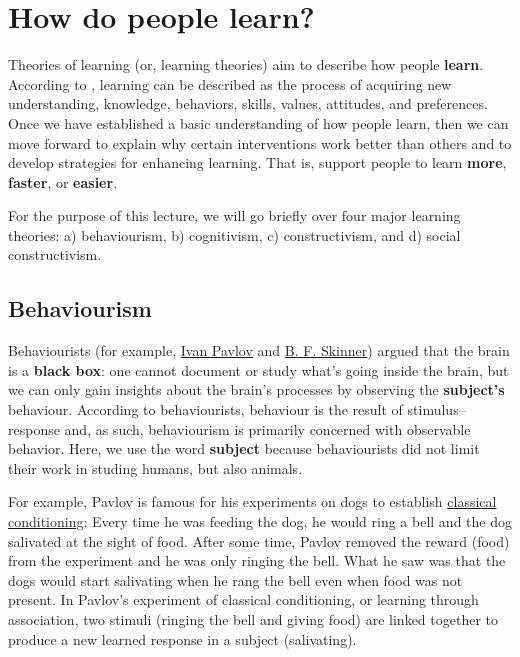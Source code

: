 \documentclass[
]{book}
\begin{document}
\section{How do people learn?}\label{how-do-people-learn}

Theories of learning (or, learning theories) aim to describe how people \textbf{learn}. According to \citep{gross2012psychology}, learning can be described as the process of acquiring new understanding, knowledge, behaviors, skills, values, attitudes, and preferences. Once we have established a basic understanding of how people learn, then we can move forward to explain why certain interventions work better than others and to develop strategies for enhancing learning. That is, support people to learn \textbf{more}, \textbf{faster}, or \textbf{easier}.

For the purpose of this lecture, we will go briefly over four major learning theories: a) behaviourism, b) cognitivism, c) constructivism, and d) social constructivism.

\subsection{Behaviourism}\label{behaviorism}

Behaviourists (for example, \href{https://en.wikipedia.org/wiki/Ivan_Pavlov}{Ivan Pavlov} and \href{https://en.wikipedia.org/wiki/B._F._Skinner}{B. F. Skinner}) argued that the brain is a \textbf{black box}: one cannot document or study what's going inside the brain, but we can only gain insights about the brain's processes by observing the \textbf{subject's} behaviour. According to behaviourists, behaviour is the result of stimulus--response and, as such, behaviourism is primarily concerned with observable behavior. Here, we use the word \textbf{subject} because behaviourists did not limit their work in studing humans, but also animals.

For example, Pavlov is famous for his experiments on dogs to establish \href{https://en.wikipedia.org/wiki/Classical_conditioning\#:~:text=Pavlov\%20called\%20the\%20dogs'\%20anticipatory,in\%20response\%20to\%20the\%20stimulus.}{classical conditioning}: Every time he was feeding the dog, he would ring a bell and the dog salivated at the sight of food. After some time, Pavlov removed the reward (food) from the experiment and he was only ringing the bell. What he saw was that the dogs would start salivating when he rang the bell even when food was not present. In Pavlov's experiment of classical conditioning, or learning through association, two stimuli (ringing the bell and giving food) are linked together to produce a new learned response in a subject (salivating).
\end{document}
